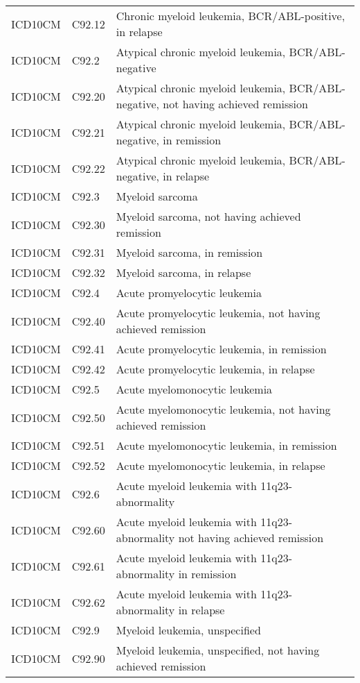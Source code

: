 \begin{longtable}{p{}p{}p{}}
  ICD10CM & C92.12 & Chronic myeloid leukemia, BCR/ABL-positive, in relapse \\ 
  ICD10CM & C92.2 & Atypical chronic myeloid leukemia, BCR/ABL-negative \\ 
  ICD10CM & C92.20 & Atypical chronic myeloid leukemia, BCR/ABL-negative, not having achieved remission \\ 
  ICD10CM & C92.21 & Atypical chronic myeloid leukemia, BCR/ABL-negative, in remission \\ 
  ICD10CM & C92.22 & Atypical chronic myeloid leukemia, BCR/ABL-negative, in relapse \\ 
  ICD10CM & C92.3 & Myeloid sarcoma \\ 
  ICD10CM & C92.30 & Myeloid sarcoma, not having achieved remission \\ 
  ICD10CM & C92.31 & Myeloid sarcoma, in remission \\ 
  ICD10CM & C92.32 & Myeloid sarcoma, in relapse \\ 
  ICD10CM & C92.4 & Acute promyelocytic leukemia \\ 
  ICD10CM & C92.40 & Acute promyelocytic leukemia, not having achieved remission \\ 
  ICD10CM & C92.41 & Acute promyelocytic leukemia, in remission \\ 
  ICD10CM & C92.42 & Acute promyelocytic leukemia, in relapse \\ 
  ICD10CM & C92.5 & Acute myelomonocytic leukemia \\ 
  ICD10CM & C92.50 & Acute myelomonocytic leukemia, not having achieved remission \\ 
  ICD10CM & C92.51 & Acute myelomonocytic leukemia, in remission \\ 
  ICD10CM & C92.52 & Acute myelomonocytic leukemia, in relapse \\ 
  ICD10CM & C92.6 & Acute myeloid leukemia with 11q23-abnormality \\ 
  ICD10CM & C92.60 & Acute myeloid leukemia with 11q23-abnormality not having achieved remission \\ 
  ICD10CM & C92.61 & Acute myeloid leukemia with 11q23-abnormality in remission \\ 
  ICD10CM & C92.62 & Acute myeloid leukemia with 11q23-abnormality in relapse \\ 
  ICD10CM & C92.9 & Myeloid leukemia, unspecified \\ 
  ICD10CM & C92.90 & Myeloid leukemia, unspecified, not having achieved remission \\ 

\end{longtable}

